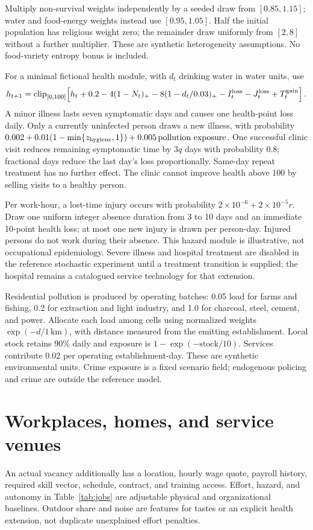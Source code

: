 \documentclass[10pt,a4paper,twocolumn]{article}
\begin{document}
Multiply non-survival weights independently by a seeded draw from
$[0.85,1.15]$; water and food-energy weights instead use $[0.95,1.05]$.
Half the initial population has religious weight zero; the remainder
draw uniformly from $[2,8]$ without a further multiplier. These are synthetic heterogeneity assumptions.
No food-variety entropy bonus is included.

For a minimal fictional health module, with $d_t$ drinking water in
water units, use
\begin{equation}
 h_{t+1}=\operatorname{clip}_{[0,100]}\!\left[
 h_t+0.2-4(1-N_t)_+-8(1-d_t/0.03)_+
 -I_t^{\rm loss}-J_t^{\rm loss}+T_t^{\rm gain}\right].
\end{equation}
A minor illness lasts seven symptomatic days and causes one health-point
loss daily. Only a currently uninfected person draws a new illness, with
probability $0.002+0.01(1-\min\{z_{\rm hygiene},1\})+
0.005\,\text{pollution exposure}$. One successful clinic visit reduces
remaining symptomatic time by $3q$ days with probability 0.8; fractional
days reduce the last day's loss proportionally. Same-day repeat treatment
has no further effect. The clinic cannot improve health above 100 by
selling visits to a healthy person.

Per work-hour, a lost-time injury occurs with probability
$2\times10^{-6}+2\times10^{-5}r$. Draw one uniform integer absence
duration from 3 to 10 days and an immediate 10-point health loss; at most
one new injury is drawn per person-day. Injured persons do not work during
their absence. This hazard module is illustrative, not occupational
epidemiology. Severe illness and hospital treatment are disabled in the
reference stochastic experiment until a treatment transition is supplied;
the hospital remains a catalogued service technology for that extension.

Residential pollution is produced by operating batches: 0.05 load for
farms and fishing, 0.2 for extraction and light industry, and 1.0 for
charcoal, steel, cement, and power. Allocate each load among cells using
normalized weights $\exp(-d/1\,\mathrm{km})$, with distance measured
from the emitting establishment. Local stock retains 90\% daily and
exposure is $1-\exp(-\mathrm{stock}/10)$. Services contribute 0.02 per
operating establishment-day. These are synthetic environmental units.
Crime exposure is a fixed scenario field; endogenous policing and crime
are outside the reference model.

\section{Workplaces, homes, and service venues}\label{app:buildings}
An actual vacancy additionally has a location, hourly wage quote, payroll
history, required skill vector, schedule, contract, and training access.
Effort, hazard, and autonomy in Table~\ref{tab:jobs} are adjustable
physical and organizational baselines. Outdoor share and noise are
features for tastes or an explicit health extension, not duplicate
unexplained effort penalties.
\end{document}
